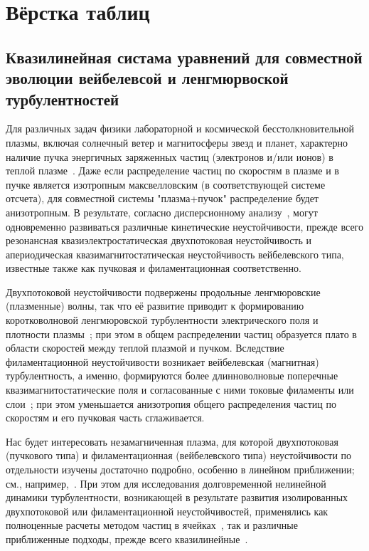 \chapter{Вёрстка таблиц}\label{ch:ch3}
\section{Квазилинейная систама уравнений для совместной эволюции вейбелевсой и ленгмюрвоской турбулентностей}

Для различных задач физики лабораторной и космической бесстолкновительной плазмы, включая солнечный ветер и магнитосферы звезд и планет, характерно наличие пучка энергичных заряженных частиц (электронов и/или ионов) в теплой плазме~\cite{Gary1993,Treumann1997,Marsch2006}. Даже если распределение частиц по скоростям в плазме и в пучке является изотропным максвелловским (в соответствующей  системе отсчета), для совместной системы "плазма+пучок" распределение будет анизотропным.  В результате, согласно дисперсионному анализу~\cite{Mikhailovsky1971,Fried1959,Krall1973,Tzoufras2006,Bret2010}, могут одновременно развиваться различные кинетические неустойчивости, прежде всего резонансная квазиэлектростатическая двухпотоковая неустойчивость и апериодическая квазимагнитостатическая неустойчивость вейбелевского типа, известные также как пучковая и филаментационная соответственно. 

Двухпотоковой неустойчивости подвержены продольные ленгмюровские (плазменные) волны, так что её развитие приводит к формированию коротковолновой ленгмюровской турбулентности электрического поля и плотности плазмы~\cite{Vedenov1963,Zakharov1972,VedenovRyutov1975,Krall1973,Appert1976,Yi2010,Bakunin2017,Sun2022}; при этом в общем распределении частиц образуется плато в области  скоростей между теплой плазмой и пучком.  Вследствие филаментационной неустойчивости возникает вейбелевская (магнитная) турбулентность, а именно, формируются более длинноволновые поперечные квазимагнитостатические поля и согласованные с ними токовые филаменты или слои~\cite{Weibel1959, Zhou2022,Fried1959, Kalman1968, Morse1971, Kocharovsky2016, Lazar2006, Stockem2009, SchaeferRolffs2006}; при этом уменьшается анизотропия общего распределения частиц по скоростям и его пучковая часть сглаживается.


Нас будет интересовать незамагниченная плазма, для которой двухпотоковая (пучкового типа) и филаментационная (вейбелевского типа) неустойчивости по отдельности изучены достаточно подробно, особенно в линейном приближении; см., например,~\cite{Mikhailovsky1971,Fried1959,Tzoufras2006,Hao2008,Bret2010,Moya2022}. При этом для исследования долговременной нелинейной динамики турбулентности, возникающей в результате развития изолированных двухпотоковой или филаментационной неустойчивостей, применялись как  полноценные расчеты методом частиц в ячейках~\cite{Kasaba2001,Dum1994,Yi2010,Ruyer2015,Dieckmann2009,Bret2010,Lazar2023,Nechaev2023,Kocharovsky2024,Garasev2022,Kuznetsov2025a}, так и различные приближенные подходы, прежде всего квазилинейные~\cite{Vedenov1963,VedenovRyutov1975,Appert1976,Bakunin2017,Ziebell2008,Lemons1979,Davidson1972,Ruyer2015,Kuznetsov2022,Kuznetsov2023}. 

